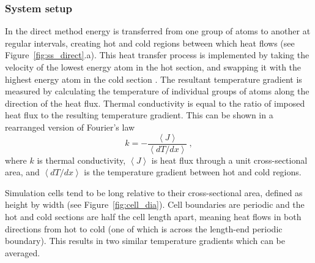\subsubsection{\label{sec:2.DM.setup}System setup}

In the direct method energy is transferred from one group of atoms to another at regular intervals, creating hot and cold regions between which heat flows (see Figure~\ref{fig:ss_direct}.a). This heat transfer process is implemented by taking the velocity of the lowest energy atom in the hot section, and swapping it with the highest energy atom in the cold section \citep[the approach from][]{Muller-Plathe1997}. The resultant temperature gradient is measured by calculating the temperature of individual groups of atoms along the direction of the heat flux. Thermal conductivity is equal to the ratio of imposed heat flux to the resulting temperature gradient. This can be shown in a rearranged version of Fourier's law
%
\begin{equation}
k = - \frac{\left \langle J \right \rangle}{\left \langle dT/dx \right \rangle}\ ,
\label{fourier2}  
\end{equation}
%
where $k$ is thermal conductivity, $\left \langle J \right \rangle$ is heat flux through a unit cross-sectional area, and $\left \langle dT/dx \right \rangle$ is the temperature gradient between hot and cold regions. 

Simulation cells tend to be long relative to their cross-sectional area, defined as height by width (see Figure~\ref{fig:cell_dia}). Cell boundaries are periodic and the hot and cold sections are half the cell length apart, meaning heat flows in both directions from hot to cold (one of which is across the length-end periodic boundary). This results in two similar temperature gradients which can be averaged.

